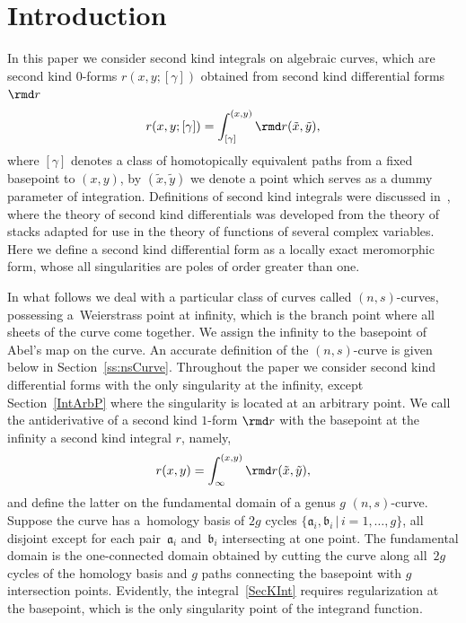 \section{Introduction}

In this paper we consider second kind integrals on algebraic curves, which are second kind $0$-forms $r(x,y;[\gamma])$ obtained from second kind differential forms $\rmd r$
\begin{gather}\label{SecKIntA}
 r(x,y;[\gamma]) = \int_{[\gamma]}^{(x,y)} \rmd r(\tilde{x},\tilde{y}),
\end{gather}
where $[\gamma]$ denotes a class of homotopically equivalent paths {from a fixed basepoint to $(x,y)$, by $(\tilde{x},\tilde{y})$ we denote a point which serves as a dummy parameter of integration}. Definitions of second kind integrals were discussed in~\cite{Hodge}, where the theory of second kind differentials was developed from the theory of stacks adapted for use in the theory of functions of several complex variables. Here we define a second kind differential form as a locally exact meromorphic form, whose all singularities are poles of order greater than one.

In what follows we deal with a particular class of curves called $(n,s)$-curves, possessing a~Weierstrass point at infinity, which is the branch point where all sheets of the curve come together. We assign the infinity to the basepoint of Abel's map on the curve. An accurate definition of the $(n,s)$-curve is given below in Section~\ref{ss:nsCurve}. Throughout the paper we consider second kind differential forms with the only singularity at the infinity, except Section~\ref{IntArbP} where the singularity is located at an arbitrary point. We call the antiderivative of a second kind $1$-form $\rmd r$ with the basepoint at the infinity a second kind integral $r$, namely,
\begin{gather}\label{SecKInt}
 r(x,y) = \int_{\infty}^{(x,y)} \rmd r(\tilde{x},\tilde{y}),
\end{gather}
and define the latter on the fundamental domain of a genus $g$ $(n,s)$-curve. Suppose the curve has a~homology basis of $2g$ cycles $\{\mathfrak{a}_i, \mathfrak{b}_i \,|\, i=1,\dots,g\}$, all disjoint except for each pair~$\mathfrak{a}_i$ and~$\mathfrak{b}_i$ intersecting at one point. The fundamental domain is the one-connected domain obtained by cutting the curve along all~$2g$ cycles of the homology basis and $g$ paths connecting the basepoint with $g$ intersection points. Evidently, the integral~\eqref{SecKInt} requires regularization at the basepoint, which is the only singularity point of the integrand function.

